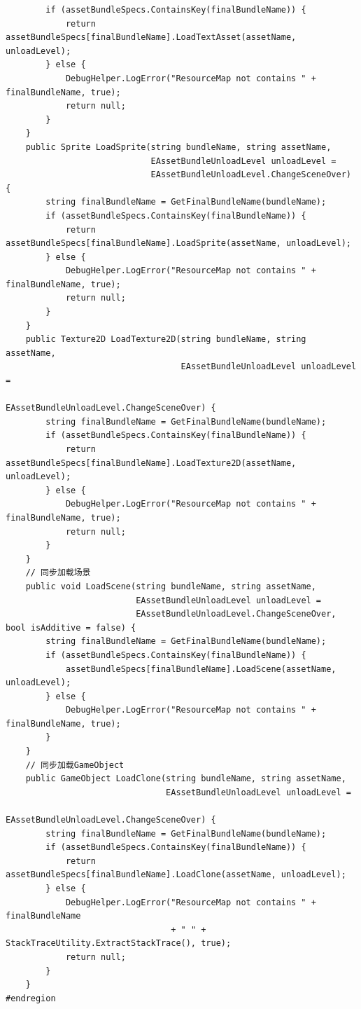 \documentclass[9pt, b5paper]{article}
\begin{document}
\begin{verbatim}
        if (assetBundleSpecs.ContainsKey(finalBundleName)) {
            return assetBundleSpecs[finalBundleName].LoadTextAsset(assetName, unloadLevel);
        } else {
            DebugHelper.LogError("ResourceMap not contains " + finalBundleName, true);
            return null;
        }
    }
    public Sprite LoadSprite(string bundleName, string assetName, 
                             EAssetBundleUnloadLevel unloadLevel = 
                             EAssetBundleUnloadLevel.ChangeSceneOver) {
        string finalBundleName = GetFinalBundleName(bundleName);
        if (assetBundleSpecs.ContainsKey(finalBundleName)) {
            return assetBundleSpecs[finalBundleName].LoadSprite(assetName, unloadLevel);
        } else {
            DebugHelper.LogError("ResourceMap not contains " + finalBundleName, true);
            return null;
        }
    }
    public Texture2D LoadTexture2D(string bundleName, string assetName, 
                                   EAssetBundleUnloadLevel unloadLevel = 
                                   EAssetBundleUnloadLevel.ChangeSceneOver) {
        string finalBundleName = GetFinalBundleName(bundleName);
        if (assetBundleSpecs.ContainsKey(finalBundleName)) {
            return assetBundleSpecs[finalBundleName].LoadTexture2D(assetName, unloadLevel);
        } else {
            DebugHelper.LogError("ResourceMap not contains " + finalBundleName, true);
            return null;
        }
    }
    // 同步加载场景
    public void LoadScene(string bundleName, string assetName, 
                          EAssetBundleUnloadLevel unloadLevel = 
                          EAssetBundleUnloadLevel.ChangeSceneOver, bool isAdditive = false) {
        string finalBundleName = GetFinalBundleName(bundleName);
        if (assetBundleSpecs.ContainsKey(finalBundleName)) {
            assetBundleSpecs[finalBundleName].LoadScene(assetName, unloadLevel);
        } else {
            DebugHelper.LogError("ResourceMap not contains " + finalBundleName, true);
        }
    }
    // 同步加载GameObject
    public GameObject LoadClone(string bundleName, string assetName, 
                                EAssetBundleUnloadLevel unloadLevel = 
                                EAssetBundleUnloadLevel.ChangeSceneOver) {
        string finalBundleName = GetFinalBundleName(bundleName);
        if (assetBundleSpecs.ContainsKey(finalBundleName)) {
            return assetBundleSpecs[finalBundleName].LoadClone(assetName, unloadLevel);
        } else {
            DebugHelper.LogError("ResourceMap not contains " + finalBundleName
                                 + " " + StackTraceUtility.ExtractStackTrace(), true);
            return null;
        }
    }
#endregion


\end{verbatim}
\end{document}

